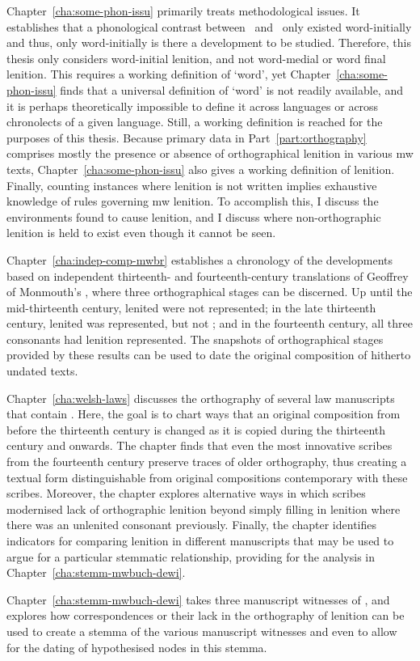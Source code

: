 Chapter~\ref{cha:some-phon-issu} primarily treats methodological issues. It establishes that a phonological contrast between \lT\ and \xD\ only existed word-initially and thus, only word-initially is there a development to be studied. Therefore, this thesis  only considers word-initial lenition, and not word-medial or word final lenition. This requires a working definition of `word', yet Chapter~\ref{cha:some-phon-issu} finds that a universal definition of `word' is not readily available, and it is perhaps theoretically impossible to define it across languages or across chronolects of a given language. Still, a working definition is reached for the purposes of this thesis. Because primary data in Part~\ref{part:orthography} comprises mostly the presence or absence of orthographical lenition in various \gls{mw} texts,  Chapter~\ref{cha:some-phon-issu} also gives a working definition of lenition. Finally, counting instances where lenition is not written implies exhaustive knowledge of rules governing \gls{mw} lenition. To accomplish this, I discuss the environments  found to cause lenition, and I discuss where non-orthographic lenition is held to exist even though it cannot be seen.

Chapter~\ref{cha:indep-comp-mwbr} establishes a chronology of the developments based on independent thirteenth- and fourteenth-century translations of Geoffrey of Monmouth's , where three orthographical stages can be discerned. Up until the mid-thirteenth century, lenited  were not represented; in the late thirteenth century, lenited  was represented, but not ; and in the fourteenth century, all three consonants had lenition represented. The snapshots of orthographical stages provided by these results can be used to date the original composition of hitherto undated texts.

Chapter~\ref{cha:welsh-laws} discusses the orthography of several law manuscripts that contain . Here, the goal is to chart ways that an original composition from before the  thirteenth century is changed as it is copied during the thirteenth century and onwards. The chapter finds that even the most innovative scribes from the fourteenth century preserve traces of older orthography, thus creating a textual form distinguishable from original compositions contemporary with these scribes. Moreover, the chapter explores  alternative ways in which scribes modernised lack of orthographic lenition beyond simply filling in lenition where there was an unlenited consonant previously. Finally, the chapter identifies indicators for comparing lenition in different manuscripts that may be used to argue for a particular stemmatic relationship, providing for the analysis in Chapter~\ref{cha:stemm-mwbuch-dewi}.

Chapter~\ref{cha:stemm-mwbuch-dewi} takes three manuscript witnesses of , and explores how correspondences or their lack in the orthography of lenition can be used to create a stemma of the various manuscript witnesses and even to allow for the dating of hypothesised nodes in this stemma. 



